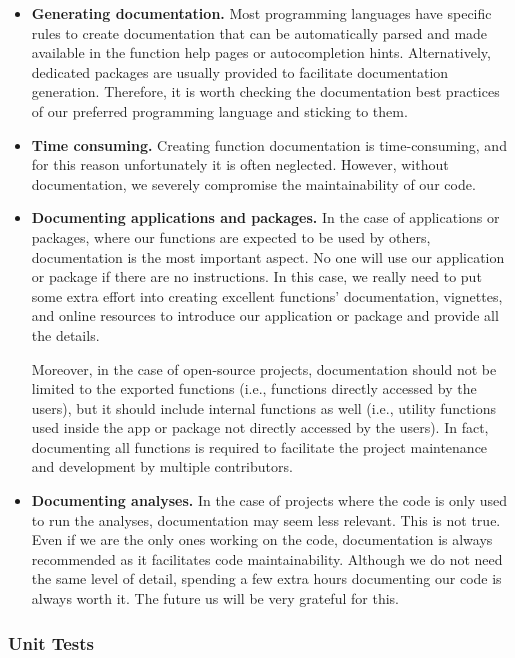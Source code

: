 \documentclass[
  11pt,
]{book}
\begin{document}
\begin{itemize}
\item
  \textbf{Generating documentation.} Most programming languages have specific rules to create documentation that can be automatically parsed and made available in the function help pages or autocompletion hints. Alternatively, dedicated packages are usually provided to facilitate documentation generation. Therefore, it is worth checking the documentation best practices of our preferred programming language and sticking to them.
\item
  \textbf{Time consuming.} Creating function documentation is time-consuming, and for this reason unfortunately it is often neglected. However, without documentation, we severely compromise the maintainability of our code.
\item
  \textbf{Documenting applications and packages.} In the case of applications or packages, where our functions are expected to be used by others, documentation is the most important aspect. No one will use our application or package if there are no instructions. In this case, we really need to put some extra effort into creating excellent functions' documentation, vignettes, and online resources to introduce our application or package and provide all the details.

  Moreover, in the case of open-source projects, documentation should not be limited to the exported functions (i.e., functions directly accessed by the users), but it should include internal functions as well (i.e., utility functions used inside the app or package not directly accessed by the users). In fact, documenting all functions is required to facilitate the project maintenance and development by multiple contributors.
\item
  \textbf{Documenting analyses.} In the case of projects where the code is only used to run the analyses, documentation may seem less relevant. This is not true. Even if we are the only ones working on the code, documentation is always recommended as it facilitates code maintainability. Although we do not need the same level of detail, spending a few extra hours documenting our code is always worth it. The future us will be very grateful for this.
\end{itemize}

\hypertarget{unit-tests}{%
\subsubsection{Unit Tests}\label{unit-tests}}
\end{document}
